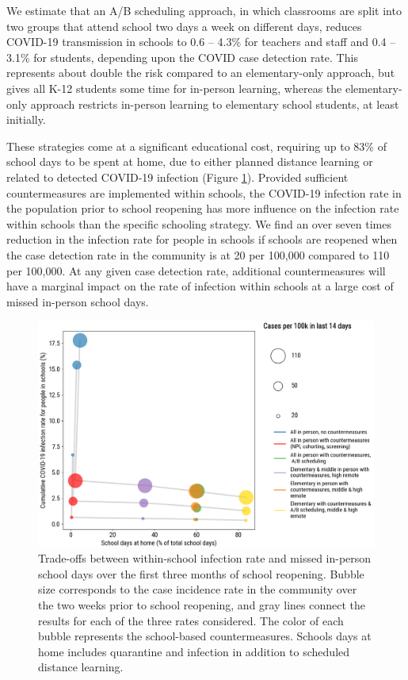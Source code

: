 \documentclass[9pt,twocolumn,twoside,lineno]{pnas-new}
\begin{document}
We estimate that an A/B scheduling approach, in which classrooms are split into two groups that attend school two days a week on different days, reduces COVID-19 transmission in schools to 0.6 -- 4.3\% for teachers and staff and 0.4 -- 3.1\% for students, depending upon the COVID case detection rate. This represents about double the risk compared to an elementary-only approach, but gives all K-12 students some time for in-person learning, whereas the elementary-only approach restricts in-person learning to elementary school students, at least initially.

These strategies come at a significant educational cost, requiring up to 83\% of school days to be spent at home, due to either planned distance learning or related to detected COVID-19 infection (Figure \ref{fig:tradeoffs}). Provided sufficient countermeasures are implemented within schools, the COVID-19 infection rate in the population prior to school reopening has more influence on the infection rate within schools than the specific schooling strategy.  We find an over seven times reduction in the infection rate for people in schools if schools are reopened when the case detection rate in the community is at 20 per 100,000 compared to 110 per 100,000. At any given case detection rate, additional countermeasures will have a marginal impact on the rate of infection within schools at a large cost of missed in-person school days.

\begin{figure}[t] %
    \centering
    \includegraphics[width=\linewidth]{tradeoffs_2020-08-06_trim_notitle.png}
    \caption{Trade-offs between within-school infection rate and missed in-person school days over the first three months of school reopening. Bubble size corresponds to the case incidence rate in the community over the two weeks prior to school reopening, and gray lines connect the results for each of the three rates considered. The color of each bubble represents the school-based countermeasures. Schools days at home includes quarantine and infection in addition to scheduled distance learning.}
    \label{fig:tradeoffs}
\end{figure}
\end{document}
